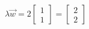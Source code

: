 \documentclass[preview]{standalone}
\begin{document}
\begin{align*}
\lambda \vec{w} = 2 \begin{bmatrix} 1 \\ 1 \end{bmatrix} = \begin{bmatrix} 2 \\ 2 \end{bmatrix}
\end{align*}
\end{document}
